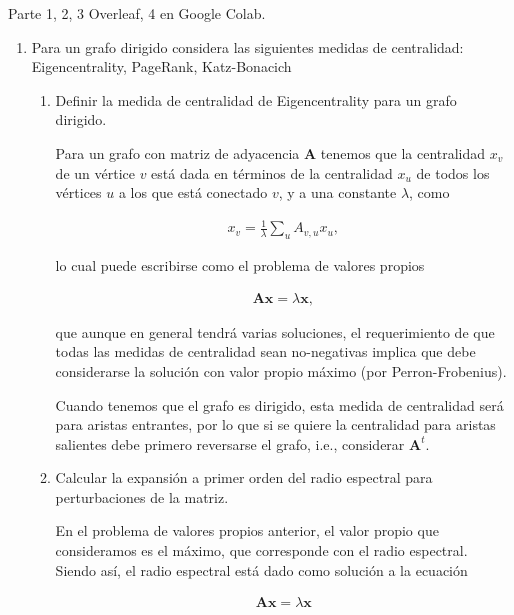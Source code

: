 \documentclass[answers]{exam}
\begin{document}
\begin{questions}

\question Parte 1, 2, 3 Overleaf, 4 en Google Colab.
\begin{enumerate}
\item Para un grafo dirigido considera las siguientes medidas de centralidad: Eigencentrality, PageRank, Katz-Bonacich

\begin{enumerate}
\item  Definir la medida de centralidad de Eigencentrality para un grafo dirigido.

\begin{solution}
Para un grafo con matriz de adyacencia $\mathbf{A}$ tenemos que la centralidad $x_v$ de un vértice $v$ está dada en términos de la centralidad $x_u$ de todos los vértices $u$ a los que está conectado $v$, y a una constante $\lambda$, como

\begin{align*}
    x_v = \frac{1}{\lambda}\sum_uA_{v,u}x_u,
\end{align*}

lo cual puede escribirse como el problema de valores propios

\begin{align*}
    \mathbf{Ax} = \lambda\mathbf{x},
\end{align*}

que aunque en general tendrá varias soluciones, el requerimiento de que todas las medidas de centralidad sean no-negativas implica que debe considerarse la solución con valor propio máximo (por Perron-Frobenius).

Cuando tenemos que el grafo es dirigido, esta medida de centralidad será para aristas entrantes, por lo que si se quiere la centralidad para aristas salientes debe primero reversarse el grafo, i.e., considerar $\mathbf{A}^t$.
\end{solution}

\item Calcular la expansión a primer orden del radio espectral para perturbaciones de la matriz.

\begin{solution}
En el problema de valores propios anterior, el valor propio que consideramos es el máximo, que corresponde con el radio espectral. Siendo así, el radio espectral está dado como solución a la ecuación

\begin{align*}
    \mathbf{Ax} = \lambda\mathbf{x}
\end{align*}


\end{solution}
\end{enumerate}
\end{enumerate}
\end{questions}
\end{document}
